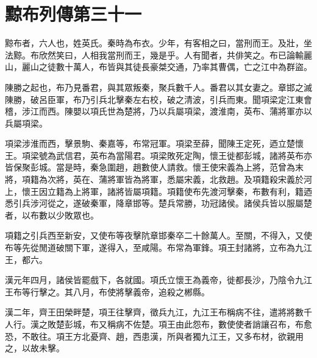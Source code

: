 \chapter{黥布列傳第三十一}

黥布者，六人也，姓英氏。秦時為布衣。少年，有客相之曰，當刑而王。及壯，坐法黥。布欣然笑曰，人相我當刑而王，幾是乎。人有聞者，共俳笑之。布已論輸麗山，麗山之徒數十萬人，布皆與其徒長豪桀交通，乃率其曹偶，亡之江中為群盜。

陳勝之起也，布乃見番君，與其眾叛秦，聚兵數千人。番君以其女妻之。章邯之滅陳勝，破呂臣軍，布乃引兵北擊秦左右校，破之清波，引兵而東。聞項梁定江東會稽，涉江而西。陳嬰以項氏世為楚將，乃以兵屬項梁，渡淮南，英布、蒲將軍亦以兵屬項梁。

項梁涉淮而西，擊景駒、秦嘉等，布常冠軍。項梁至薛，聞陳王定死，迺立楚懷王。項梁號為武信君，英布為當陽君。項梁敗死定陶，懷王徙都彭城，諸將英布亦皆保聚彭城。當是時，秦急圍趙，趙數使人請救。懷王使宋義為上將，范曾為末將，項籍為次將，英在、蒲將軍皆為將軍，悉屬宋義，北救趙。及項籍殺宋義於河上，懷王因立籍為上將軍，諸將皆屬項籍。項籍使布先渡河擊秦，布數有利，籍迺悉引兵涉河從之，遂破秦軍，降章邯等。楚兵常勝，功冠諸侯。諸侯兵皆以服屬楚者，以布數以少敗眾也。

項籍之引兵西至新安，又使布等夜擊阬章邯秦卒二十餘萬人。至關，不得入，又使布等先從閒道破關下軍，遂得入，至咸陽。布常為軍鋒。項王封諸將，立布為九江王，都六。

漢元年四月，諸侯皆罷戲下，各就國。項氏立懷王為義帝，徙都長沙，乃陰令九江王布等行擊之。其八月，布使將擊義帝，追殺之郴縣。

漢二年，齊王田榮畔楚，項王往擊齊，徵兵九江，九江王布稱病不往，遣將將數千人行。漢之敗楚彭城，布又稱病不佐楚。項王由此怨布，數使使者誚讓召布，布愈恐，不敢往。項王方北憂齊、趙，西患漢，所與者獨九江王，又多布材，欲親用之，以故未擊。

